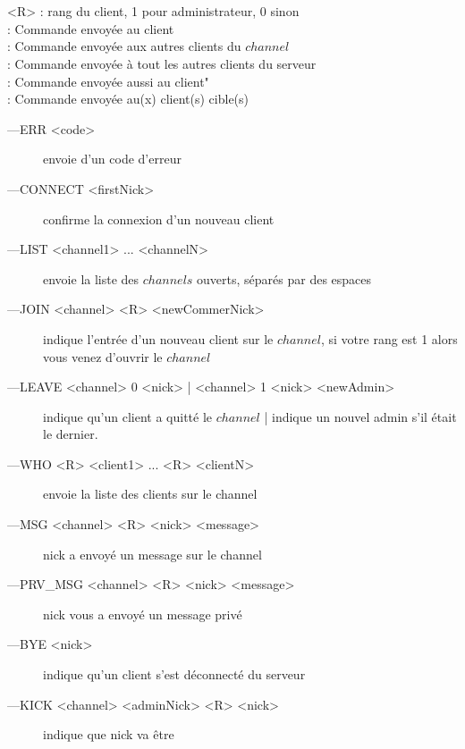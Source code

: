 \documentclass[12pt]{article}
\begin{document}
\\

\\<R> :  rang du client, 1 pour administrateur, 0 sinon
\\ : Commande envoyée au client
\\ : Commande envoyée aux autres clients du $channel$
\\ : Commande envoyée à tout les autres clients du serveur
\\ : Commande envoyée aussi au client"
\\ : Commande envoyée au(x) client(s) cible(s)

\begin{description}
    \item[---ERR <code>]  envoie d'un code d'erreur
    \item[---CONNECT <firstNick>]  confirme la connexion
                                                        d'un nouveau client
    \item[---LIST <channel1> ... <channelN>]  envoie la liste des $channels$
                                                ouverts, séparés par des espaces
    \item[---JOIN <channel> <R> <newCommerNick>]  indique l'entrée
                                d'un nouveau client sur le $channel$, si votre rang est
                                1 alors vous venez d'ouvrir le $channel$
    \item[---LEAVE <channel> 0 <nick> | <channel> 1 <nick> <newAdmin>] 
                indique qu'un client a quitté le $channel$ | indique un nouvel admin
                s'il était le dernier.
    \item[---WHO <R> <client1> ... <R> <clientN>]  envoie la liste des clients
                                    sur le channel
    \item[---MSG <channel> <R> <nick> <message>]  nick a envoyé un message sur le channel
    \item[---PRV\_MSG <channel> <R> <nick> <message>]  nick vous a envoyé un message privé
    \item[---BYE <nick>]  indique qu'un client s'est déconnecté du serveur
    \item[---KICK <channel> <adminNick> <R> <nick>]  indique que nick va être

\end{description}
\end{document}
